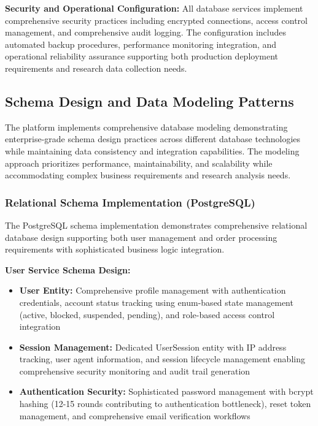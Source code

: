 \textbf{Security and Operational Configuration:}
All database services implement comprehensive security practices including encrypted connections, access control management, and comprehensive audit logging. The configuration includes automated backup procedures, performance monitoring integration, and operational reliability assurance supporting both production deployment requirements and research data collection needs.

\subsection{Schema Design and Data Modeling Patterns}

The platform implements comprehensive database modeling demonstrating enterprise-grade schema design practices across different database technologies while maintaining data consistency and integration capabilities. The modeling approach prioritizes performance, maintainability, and scalability while accommodating complex business requirements and research analysis needs.

\subsubsection{Relational Schema Implementation (PostgreSQL)}

The PostgreSQL schema implementation demonstrates comprehensive relational database design supporting both user management and order processing requirements with sophisticated business logic integration.

\textbf{User Service Schema Design:}
\begin{itemize}
\item \textbf{User Entity:} Comprehensive profile management with authentication credentials, account status tracking using enum-based state management (active, blocked, suspended, pending), and role-based access control integration
\item \textbf{Session Management:} Dedicated UserSession entity with IP address tracking, user agent information, and session lifecycle management enabling comprehensive security monitoring and audit trail generation
\item \textbf{Authentication Security:} Sophisticated password management with bcrypt hashing (12-15 rounds contributing to authentication bottleneck), reset token management, and comprehensive email verification workflows
\end{itemize}

